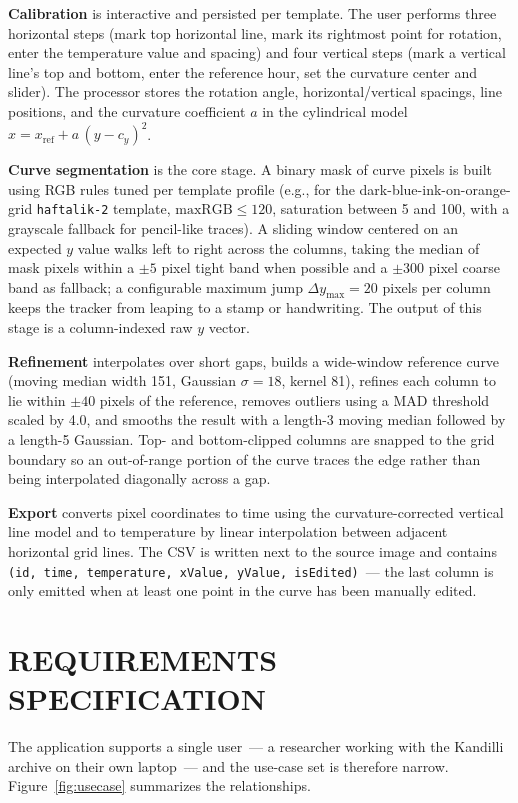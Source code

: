 \documentclass[a4paper,12pt]{report}
\begin{document}
\textbf{Calibration} is interactive and persisted per template. The user performs three horizontal steps (mark top horizontal line, mark its rightmost point for rotation, enter the temperature value and spacing) and four vertical steps (mark a vertical line's top and bottom, enter the reference hour, set the curvature center and slider). The processor stores the rotation angle, horizontal/vertical spacings, line positions, and the curvature coefficient $a$ in the cylindrical model $x = x_{\text{ref}} + a\,(y - c_y)^2$.

\textbf{Curve segmentation} is the core stage. A binary mask of curve pixels is built using RGB rules tuned per template profile (e.g., for the dark-blue-ink-on-orange-grid \texttt{haftalik-2} template, $\text{maxRGB}\le 120$, saturation between 5 and 100, with a grayscale fallback for pencil-like traces). A sliding window centered on an expected $y$ value walks left to right across the columns, taking the median of mask pixels within a $\pm 5$ pixel tight band when possible and a $\pm 300$ pixel coarse band as fallback; a configurable maximum jump $\Delta y_{\max}=20$ pixels per column keeps the tracker from leaping to a stamp or handwriting. The output of this stage is a column-indexed raw $y$ vector.

\textbf{Refinement} interpolates over short gaps, builds a wide-window reference curve (moving median width 151, Gaussian $\sigma=18$, kernel 81), refines each column to lie within $\pm 40$ pixels of the reference, removes outliers using a MAD threshold scaled by 4.0, and smooths the result with a length-3 moving median followed by a length-5 Gaussian. Top- and bottom-clipped columns are snapped to the grid boundary so an out-of-range portion of the curve traces the edge rather than being interpolated diagonally across a gap.

\textbf{Export} converts pixel coordinates to time using the curvature-corrected vertical line model and to temperature by linear interpolation between adjacent horizontal grid lines. The CSV is written next to the source image and contains \texttt{(id, time, temperature, xValue, yValue, isEdited)}~--- the last column is only emitted when at least one point in the curve has been manually edited.

\chapter{REQUIREMENTS SPECIFICATION}

The application supports a single user~--- a researcher working with the Kandilli archive on their own laptop~--- and the use-case set is therefore narrow. Figure~\ref{fig:usecase} summarizes the relationships.
\end{document}
